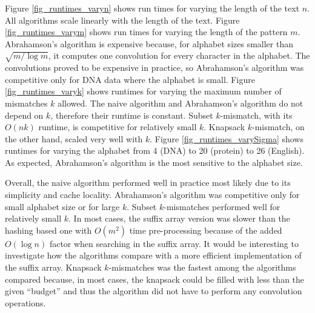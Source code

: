  Figure \ref{fig_runtimes_varyn} shows run times for varying the length of
 the text $n$. All algorithms scale linearly with the length of the text.
 Figure \ref{fig_runtimes_varym} shows run times for varying the length of
 the pattern $m$. Abrahamson's algorithm is expensive because, for alphabet
 sizes smaller than $\sqrt{m/\log m}$, it computes one convolution for every
 character in the alphabet. The convolutions proved to be expensive in practice, so
 Abrahamson's algorithm  was competitive only for DNA data where the
 alphabet is small.
 Figure \ref{fig_runtimes_varyk} shows runtimes for varying the maximum number
 of mismatches $k$ allowed. The naive algorithm and Abrahamson's algorithm do
 not depend on $k$, therefore their runtime is constant. Subset $k$-mismatch, with
 its $O(nk)$ runtime, is competitive for relatively small $k$. Knapsack
 $k$-mismatch, on the other hand, scaled very well with $k$.
 Figure \ref{fig_runtimes_varySigma} shows runtimes for varying the alphabet from 4
 (DNA) to 20 (protein) to 26 (English). As expected, Abrahamson's algorithm is
 the most sensitive to the alphabet size.
 
  Overall, the naive algorithm performed well in practice most likely due to
  its simplicity and cache locality.
 Abrahamson's algorithm was competitive only for small alphabet size or
 for large $k$. Subset $k$-mismatches performed well for relatively small $k$.
 In most cases, the suffix array version was slower than the hashing
 based one with $O(m^2)$ time pre-processing 
 because of the added $O(\log n)$ factor when searching in the suffix array. It
 would be interesting to investigate how the algorithms compare with a more
 efficient implementation of the suffix array. Knapsack $k$-mismatches was the
 fastest among the algorithms compared because, in most cases, the
 knapsack could be filled with less than the given ``budget'' and thus the
 algorithm did not have to perform any convolution operations. 

